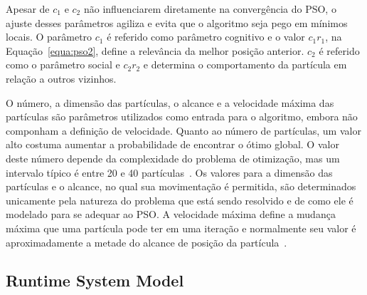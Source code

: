 Apesar de $c_1$ e $c_2$ não influenciarem diretamente na convergência do PSO, o ajuste desses parâmetros agiliza e evita que o algoritmo seja pego em mínimos locais. O parâmetro $c_1$ é referido como parâmetro cognitivo e o valor $c_1r_1$, na Equação~\ref{equa:pso2}, define a relevância da melhor posição anterior. $c_2$ é referido como o parâmetro social e $c_2r_2$ e determina o comportamento da partícula em relação a outros vizinhos.

O número, a dimensão das partículas, o alcance e a velocidade máxima das partículas são parâmetros utilizados como entrada para o algoritmo, embora não componham a definição de velocidade. Quanto ao número de partículas, um valor alto costuma aumentar a probabilidade de encontrar o ótimo global. O valor deste número depende da complexidade do problema de otimização, mas um intervalo típico é entre 20 e 40 partículas~\cite {rodriguez2014}. Os valores para a dimensão das partículas e o alcance, no qual sua movimentação é permitida, são determinados unicamente pela natureza do problema que está sendo resolvido e de como ele é modelado para se adequar ao PSO. A velocidade máxima define a mudança máxima que uma partícula pode ter em uma iteração e normalmente seu valor é aproximadamente a metade do alcance de posição da partícula~\cite{rodriguez2014}.

\subsection{Runtime System Model}
\label{subsec:runtime}
